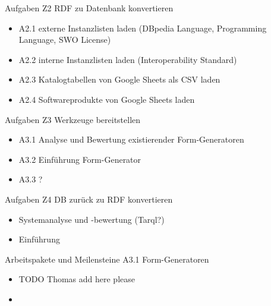 \documentclass[aspectratio=169]{beamer}
\begin{document}
\begin{frame}{Aufgaben Z2 RDF zu Datenbank konvertieren}
\begin{itemize}
\item A2.1 externe Instanzlisten laden (DBpedia Language, Programming Language, SWO License) \checkmark
\item A2.2 interne Instanzlisten laden (Interoperability Standard) \checkmark
\item A2.3 Katalogtabellen von Google Sheets als CSV laden \checkmark
\item A2.4 Softwareprodukte von Google Sheets laden
\end{itemize}
\end{frame}

\begin{frame}{Aufgaben Z3 Werkzeuge bereitstellen}
\begin{itemize}
\item A3.1 Analyse und Bewertung existierender Form-Generatoren
\item A3.2 Einführung Form-Generator
\item A3.3 ?
\end{itemize}
\end{frame}

\begin{frame}{Aufgaben Z4 DB zurück zu RDF konvertieren}
\begin{itemize}
\item Systemanalyse und -bewertung (Tarql?)
\item Einführung
\end{itemize}
\end{frame}

\begin{frame}{Arbeitspakete und Meilensteine A3.1 Form-Generatoren}
\begin{itemize}
\item TODO Thomas add here please
\item 
\end{itemize}
\end{frame}

\iffalse
\begin{frame}{Arbeitspakete und Meilensteine}
\begin{itemize}
\item 
\item 
\end{itemize}
\end{frame}
\fi
\end{document}
